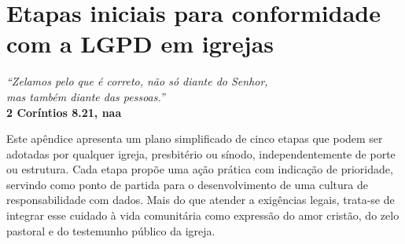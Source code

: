 \chapter{Etapas iniciais para conformidade com a LGPD em igrejas}
\label{apendice:etapas-lgpd-igrejas}

\vspace{1em}
\begin{center}
\textit {``Zelamos pelo que é correto, não só diante do Senhor,\\ mas também diante das pessoas.''}\\
\textbf{2 Coríntios 8.21, \gls{naa}}
\end{center}
\vspace{1em}

Este apêndice apresenta um plano simplificado de cinco etapas que podem ser adotadas por qualquer igreja, presbitério ou sínodo, independentemente de porte ou estrutura. Cada etapa propõe uma ação prática com indicação de prioridade, servindo como ponto de partida para o desenvolvimento de uma cultura de responsabilidade com dados. Mais do que atender a exigências legais, trata-se de integrar esse cuidado à vida comunitária como expressão do amor cristão, do zelo pastoral e do testemunho público da igreja.

